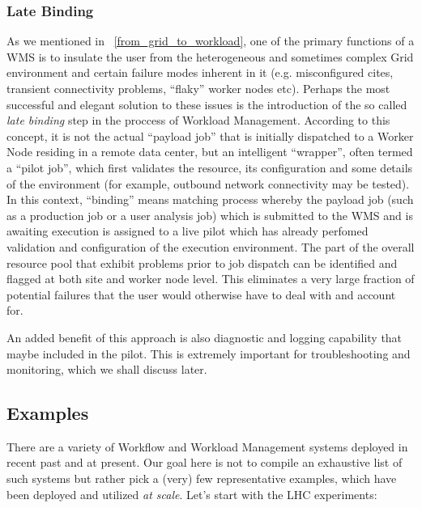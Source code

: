 \subsubsection{Late Binding}
As we mentioned in ~\ref{from_grid_to_workload}, one of the primary functions of a WMS is to insulate the user from the heterogeneous and sometimes complex
Grid environment and certain failure modes inherent in it (e.g. misconfigured cites, transient connectivity problems, ``flaky'' worker nodes etc).
Perhaps the most successful and elegant solution to these issues is the introduction of the so called \textit{late binding} step in
the proccess of Workload Management. According to this concept, it is not the actual ``payload job'' that is initially dispatched to a  Worker Node residing in a
remote data center, but an intelligent ``wrapper'', often termed a ``pilot job'', which first validates the resource, its configuration and some details of the environment
(for example, outbound network connectivity may be tested). In this context, ``binding'' means matching process whereby the payload job (such as a production job or
a user analysis job) which is submitted to the WMS and is awaiting execution is assigned to a live pilot which has already perfomed validation and configuration of
the execution environment. The part of the overall resource pool that exhibit problems prior to job dispatch can be identified and flagged at both site and worker node
level. This eliminates a very large fraction of potential failures that the user would otherwise have to deal with and account for.

An added benefit of this approach is also diagnostic and logging capability that maybe included
in the pilot. This is extremely important for troubleshooting and monitoring, which we shall discuss later.


\subsection{Examples}
\label{wms_examples}
There are a variety of Workflow and Workload Management systems deployed in recent past and at present. Our goal here is not to compile an exhaustive list of such systems but rather pick a (very) few representative examples, which have been deployed and utilized \textit{at scale}.
Let's start with the LHC experiments:

